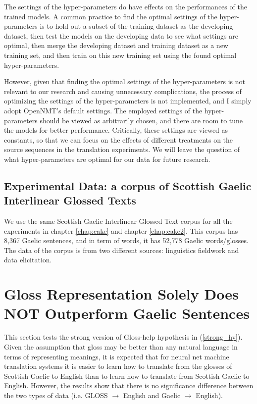 \documentclass[final]{ua-thesis}
\numberwithin{equation}{section}
\begin{document}
The settings of the hyper-parameters do have effects on the performances of the trained models.
A common practice to find the optimal settings of the hyper-parameters is to hold out a subset of the training dataset as the developing dataset, then test the models on the developing data to see what settings are optimal, then merge the developing dataset and training dataset as a new training set, and then train on this new training set using the found optimal hyper-parameters.

However, given that finding the optimal settings of the hyper-parameters is not relevant to our research and causing unnecessary complications, the process of optimizing the settings of the hyper-parameters is not implemented, and I simply adopt OpenNMT's default settings. The employed settings of the hyper-parameters should be viewed as arbitrarily chosen, and there are room to tune the models for better performance. Critically, these settings are viewed as constants, so that we can focus on the effects of different treatments on the source sequences in the translation experiments.  We will leave the question of what hyper-parameters are optimal for our data for future research.

\subsection{Experimental Data: a corpus of Scottish Gaelic Interlinear Glossed Texts}

We use the same Scottish Gaelic Interlinear Glossed Text corpus \citep{gaelic_igt} for all the experiments in chapter \ref{chap:cake} and chapter \ref{chap:cake2}. 
This corpus has 8,367 Gaelic sentences, and in term of words, it has 52,778 Gaelic words/glosses. The data of the corpus is from two different sources: linguistics fieldwork and data elicitation.


\section{Gloss Representation Solely Does NOT Outperform Gaelic Sentences} \label{gd_to_gl_to_en}
This section tests the strong version of Gloss-help hypothesis in (\ref{strong_hy}).
Given the assumption that gloss may be better than any natural language in terms of representing meanings, it is expected that for neural net machine translation systems it is easier to learn how to translate from the glosses of Scottish Gaelic to English than to learn how to translate from Scottish Gaelic to English. However, the results show that there is no significance difference between the two types of data (i.e. GLOSS $\rightarrow$ English and Gaelic $\rightarrow$ English).
\end{document}
